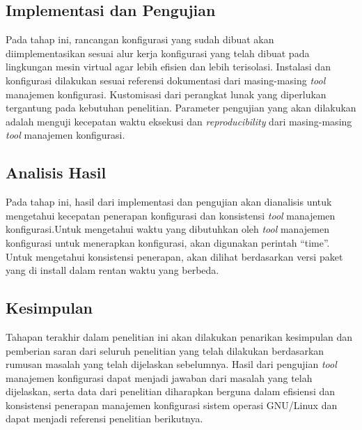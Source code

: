 \documentclass[10pt,]{report}
\begin{document}
\begin{adjustwidth}{20pt}{}
	\subsection{Implementasi dan Pengujian}
	\vspace{-3mm}
	\begin{adjustwidth}{20pt}{}
		Pada tahap ini, rancangan konfigurasi yang sudah dibuat akan
		diimplementasikan sesuai alur kerja konfigurasi yang telah dibuat pada
		lingkungan mesin virtual agar lebih efisien dan lebih terisolasi. Instalasi
		dan konfigurasi dilakukan sesuai referensi dokumentasi dari masing-masing
		\textit{tool} manajemen konfigurasi. Kustomisasi dari perangkat lunak yang
		diperlukan tergantung pada kebutuhan penelitian. Parameter pengujian yang
		akan dilakukan adalah menguji kecepatan waktu eksekusi dan \textit{reproducibility} dari
		masing-masing \textit{tool} manajemen konfigurasi.
	\end{adjustwidth}
\end{adjustwidth}
\begin{adjustwidth}{20pt}{}
	\subsection{Analisis Hasil}
	\vspace{-3mm}
	\begin{adjustwidth}{20pt}{}
		Pada tahap ini, hasil dari implementasi dan pengujian akan dianalisis untuk
		mengetahui kecepatan penerapan konfigurasi dan konsistensi \textit{tool} manajemen
		konfigurasi.Untuk mengetahui waktu yang dibutuhkan oleh \textit{tool} manajemen
		konfigurasi untuk menerapkan konfigurasi, akan digunakan perintah “time”.
		Untuk mengetahui konsistensi penerapan, akan dilihat berdasarkan versi
		paket yang di install dalam rentan waktu yang berbeda.
	\end{adjustwidth}
\end{adjustwidth}

\begin{adjustwidth}{20pt}{}
	\subsection{Kesimpulan}
	\vspace{-3mm}
	\begin{adjustwidth}{20pt}{}
		Tahapan terakhir dalam penelitian ini akan dilakukan penarikan kesimpulan
		dan pemberian saran dari seluruh penelitian yang telah dilakukan
		berdasarkan rumusan masalah yang telah dijelaskan sebelumnya. Hasil dari
		pengujian \textit{tool} manajemen konfigurasi dapat menjadi jawaban dari masalah
		yang telah dijelaskan, serta data dari penelitian diharapkan berguna dalam
		efisiensi dan konsistensi penerapan manajemen konfigurasi sistem operasi
		GNU/Linux dan dapat menjadi referensi penelitian berikutnya.
	\end{adjustwidth}
\end{adjustwidth}
\vspace{3mm}
\end{document}
